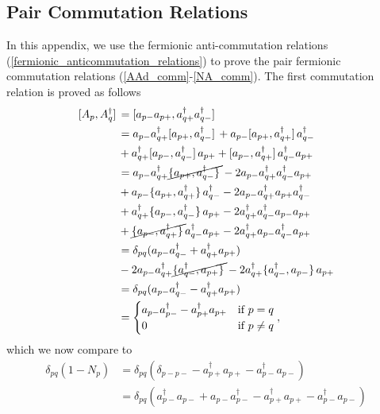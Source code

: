 \documentclass[Dual]{msu-thesis}
\begin{document}
\begin{appendices}
\chapter{Pair Commutation Relations}
\label{appendix:pair_commutation_relations}

In this appendix, we use the fermionic anti-commutation relations (\ref{fermionic_anticommutation_relations})
to prove the pair fermionic commutation relations (\ref{AAd_comm}-\ref{NA_comm}).
The first commutation relation is proved as follows
\begin{align}
\comm*{A_p}{A^\dagger_q}
&=
\comm*{a_{p-}a_{p+}}{a^\dagger_{q+}a^\dagger_{q-}}
\\
&=
a_{p-}a^\dagger_{q+}\comm*{a_{p+}}{a^\dagger_{q-}}
+
a_{p-}\comm*{a_{p+}}{a^\dagger_{q+}}a^\dagger_{q-}
\nonumber
\\
&+
a^\dagger_{q+}\comm*{a_{p-}}{a^\dagger_{q-}}a_{p+}
+
\comm*{a_{p-}}{a^\dagger_{q+}}a^\dagger_{q-}a_{p+}
\\
&=
a_{p-}a^\dagger_{q+}\cancel{\acomm*{a_{p+}}{a^\dagger_{q-}}}
-
2a_{p-}a^\dagger_{q+}a^\dagger_{q-}a_{p+}
\nonumber
\\
&+
a_{p-}\acomm*{a_{p+}}{a^\dagger_{q+}}a^\dagger_{q-}
-
2a_{p-}a^\dagger_{q+}a_{p+}a^\dagger_{q-}
\nonumber
\\
&+
a^\dagger_{q+}\acomm*{a_{p-}}{a^\dagger_{q-}}a_{p+}
-
2a^\dagger_{q+}a^\dagger_{q-}a_{p-}a_{p+}
\nonumber
\\
&+
\cancel{\acomm*{a_{p-}}{a^\dagger_{q+}}}a^\dagger_{q-}a_{p+}
-
2a^\dagger_{q+}a_{p-}a^\dagger_{q-}a_{p+}
\\
&=
\delta_{pq}(a_{p-}a^\dagger_{q-}+a^\dagger_{q+}a_{p+})
\nonumber
\\
&-
2a_{p-}a^\dagger_{q+}\cancel{\acomm*{a^\dagger_{q-}}{a_{p+}}}
-
2a^\dagger_{q+}\acomm*{a^\dagger_{q-}}{a_{p-}}a_{p+}
\\
&=
\delta_{pq}(a_{p-}a^\dagger_{q-}-a^\dagger_{q+}a_{p+})
\\
&=
\begin{cases}
a_{p-}a^\dagger_{p-}-a^\dagger_{p+}a_{p+} & \text{if} \ p=q
\\
0 & \text{if} \ p\neq q
\end{cases},
\end{align}
which we now compare to
\begin{align}
\delta_{pq}(1-N_p)
&=
\delta_{pq}(\delta_{p-p-}-a^\dagger_{p+}a_{p+}-a^\dagger_{p-}a_{p-})
\\
&=
\delta_{pq}(a^\dagger_{p-}a_{p-}+a_{p-}a^\dagger_{p-}-a^\dagger_{p+}a_{p+}-a^\dagger_{p-}a_{p-})

\end{align}
\end{appendices}
\end{document}
